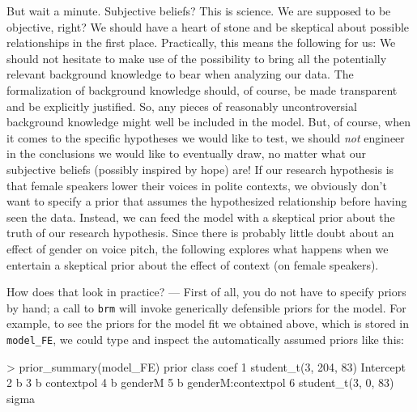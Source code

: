 \documentclass[nobib]{tufte-handout}
\begin{document}
But wait a minute. Subjective beliefs? This is science. We are supposed to be objective, right?
We should have a heart of stone and be skeptical about possible relationships in the first
place. Practically, this means the following for us: We should not hesitate to make use of the
possibility to bring all the potentially relevant background knowledge to bear when analyzing
our data. The formalization of background knowledge should, of course, be made transparent and
be explicitly justified. So, any pieces of reasonably uncontroversial background knowledge
might well be included in the model. But, of course, when it comes to the specific hypotheses
we would like to test, we should \emph{not} engineer in the conclusions we would like to
eventually draw, no matter what our subjective beliefs (possibly inspired by hope) are! If our
research hypothesis is that female speakers lower their voices in polite contexts, we obviously
don't want to specify a prior that assumes the hypothesized relationship before having seen the
data. Instead, we can feed the model with a skeptical prior about the truth of our
research hypothesis. Since there is probably little doubt about an effect of gender on voice
pitch, the following explores what happens when we entertain a skeptical prior about the effect
of context (on female speakers).


How does that look in practice? --- First of all, you do not have to specify priors by hand; a call to \texttt{brm} will invoke generically defensible priors for the model. For example, to see the priors for the model fit we obtained above, which is stored in \texttt{model\_FE}, we could type and inspect the automatically assumed priors like this:

\medskip

\begin{minipage}[]{\textwidth}
\begin{rc}
> prior_summary(model_FE)
                  prior     class               coef 
1 student_t(3, 204, 83) Intercept                    
2                               b                    
3                               b         contextpol 
4                               b            genderM 
5                               b genderM:contextpol 
6   student_t(3, 0, 83)     sigma  
\end{rc}
\end{minipage}
\end{document}
